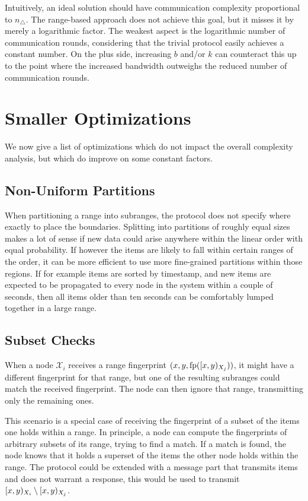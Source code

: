 Intuitively, an ideal solution should have communication complexity proportional to $n_{\triangle}$. The range-based approach does not achieve this goal, but it misses it by merely a logarithmic factor. The weakest aspect is the logarithmic number of communication rounds, considering that the trivial protocol easily achieves a constant number. On the plus side, increasing $b$ and/or $k$ can counteract this up to the point where the increased bandwidth outweighs the reduced number of communication rounds.

\section{Smaller Optimizations}
\label{set-reconciliation-simple-optimizations}

We now give a list of optimizations which do not impact the overall complexity analysis, but which do improve on some constant factors.

\subsection{Non-Uniform Partitions}

When partitioning a range into subranges, the protocol does not specify where exactly to place the boundaries. Splitting into partitions of roughly equal sizes makes a lot of sense if new data could arise anywhere within the linear order with equal probability. If however the items are likely to fall within certain ranges of the order, it can be more efficient to use more fine-grained partitions within those regions. If for example items are sorted by timestamp, and new items are expected to be propagated to every node in the system within a couple of seconds, then all items older than ten seconds can be comfortably lumped together in a large range.

\subsection{Subset Checks}
\label{subset-checks}

When a node $\mathcal{X}_i$ receives a range fingerprint $({x}, {y}, {\operatorname{fp}([{x},{y})_{X_j})})$, it might have a different fingerprint for that range, but one of the resulting subranges could match the received fingerprint. The node can then ignore that range, transmitting only the remaining ones.

This scenario is a special case of receiving the fingerprint of a subset of the items one holds within a range. In principle, a node can compute the fingerprints of arbitrary subsets of its range, trying to find a match. If a match is found, the node knows that it holds a superset of the items the other node holds within the range. The protocol could be extended with a message part that transmits items and does not warrant a response, this would be used to transmit $[{x},{y})_{X_i} \setminus [{x},{y})_{X_j}$.

